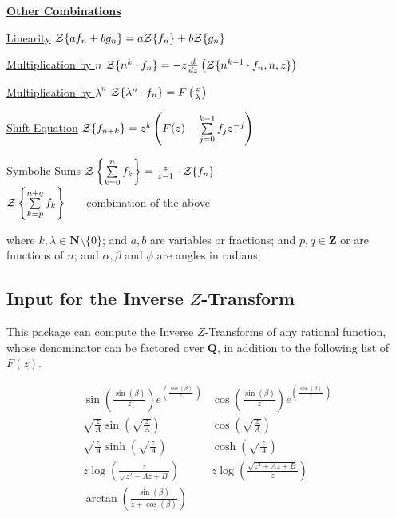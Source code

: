 \underline{{\bf Other Combinations}}

\begin{list}{}{
    \setlength{\leftmargin}{35mm}
    \setlength{\labelwidth}{\leftmargin}\addtolength{\labelwidth}{-\labelsep}
    \renewcommand{\makelabel}[1]{#1}
  }
\item[\underline{Linearity}]
  ${\cal Z} \{a f_n+b g_n \} = a{\cal Z} \{f_n\}+b{\cal Z}\{g_n\}$
\item[\underline{Multiplication by $n$}]
  ${\cal Z} \{n^k \cdot f_n\} = -z \frac{d}{dz} \left({\cal Z}\{n^{k-1} \cdot f_n,n,z\} \right)$
\item[\underline {Multiplication by $\lambda^n$}]
  ${\cal Z} \{\lambda^n \cdot f_n\}=F \left(\frac{z}{\lambda}\right)$
\item[\underline {Shift Equation}]
  ${\cal Z} \{f_{n+k}\} =
           z^k \left(F(z) - \sum\limits^{k-1}_{j=0} f_j z^{-j}\right)$
\item[\underline {Symbolic Sums}]
  ${\cal Z} \left\{ \sum\limits_{k=0}^{n} f_k \right\} =
  \frac{z}{z-1} \cdot {\cal Z} \{f_n\}$ \\[\baselineskip]
  ${\cal Z} \left\{ \sum\limits_{k=p}^{n+q} f_k \right\}$
  \ \ \ combination of the above
\end{list}

where $k,\lambda \in \mathbf{N} \setminus \{0\}$; and $a,b$ are variables or
fractions; and $p,q \in \mathbf{Z}$ or are functions of $n$; and
$\alpha,\beta$ and $\phi$ are angles in radians.

\subsection[Input for the Inverse Z-Transform]{Input for the Inverse $Z$-Transform}

This package can compute the Inverse $Z$-Transforms of any rational
function, whose denominator can be factored over $\mathbf{Q}$, in
addition to the following list of $F(z)$.

{\setlength{\arraycolsep}{1cm}
\[
\renewcommand{\arraystretch}{2}
\begin{array}{cc}
  \sin \left(\frac{\sin (\beta)}{z} \right) e^{\left(\frac{\cos (\beta)}{z} \ \right)}
  & \cos \left(\frac{\sin (\beta)}{z} \right) e^{\left(\frac{\cos (\beta)}{z} \ \right)} \\
  \sqrt{\frac{z}{A}} \sin \left( \sqrt{\frac{z}{A}} \right)
  & \cos \left( \sqrt{\frac{z}{A}} \right) \\
  \sqrt{\frac{z}{A}} \sinh \left( \sqrt{\frac{z}{A}} \right)
  & \cosh \left( \sqrt{\frac{z}{A}} \right) \\
  z \log \left(\frac{z}{\sqrt{z^2-A z+B}} \right)
  & z \log \left(\frac{\sqrt{z^2+A z+B}}{z} \right) \\
  \arctan \left(\frac{\sin (\beta)}{z+\cos (\beta)} \right)
\end{array}
\]}

